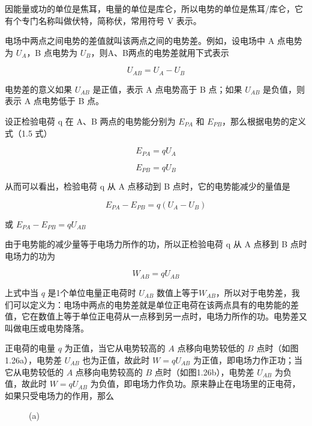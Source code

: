 因能量或功的单位是焦耳，电量的单位是库仑，所以电势的单位是焦耳/库仑，它有个专门名称叫做伏特，简称伏，常用符号
V 表示。

电场中两点之间电势的差值就叫该两点之间的电势差。例如，设电场中 A
点电势为 \(U_{A}\)，B 点电势为 \(U_{B}\)，则A、B两点的电势差就用下式表示

\[
U_{A B} = U_{A} - U_{B} \tag{1.6}
\]

电势差的意义如果 \(U_{AB}\) 是正值，表示 A 点电势高于 B 点；如果
\(U_{AB}\) 是负值，则表示 A 点电势低于 B 点。

设正检验电荷 q 在 A、B 两点的电势能分别为 \(E_{PA}\) 和
\(E_{PB}\)，那么根据电势的定义式（1.5 式）

\[
E_{P A} = q U_{A}
\]

\[
E_{P B} = q U_{B}
\]

从而可以看出，检验电荷 q 从 A 点移动到 B 点时，它的电势能减少的量值是

\[
E_{P A} - E_{P B} = q (U_{A} - U_{B})
\]

或 \(E_{PA}-E_{PB}=qU_{AB}\)

由于电势能的减少量等于电场力所作的功，所以正检验电荷 q 从 A 点移到 B
点时电场力的功为

\[
W_{A B} = q U_{A B} \tag{1.7}
\]

上式中当 \(q\) 是1个单位电量正电荷时 \(U_{AB}\)
数值上等于\(W_{AB}\)，所以对于电势差，我们可以定义为：电场中两点的电势差就是单位正电荷在该两点具有的电势能的差值，它在数值上等于单位正电荷从一点移到另一点时，电场力所作的功。电势差又叫做电压或电势降落。

正电荷的电量 \(q\) 为正值，当它从电势较高的 \(A\) 点移向电势较低的 \(B\)
点时（如图1.26a），电势差 \(U_{AB}\) 也为正值，故此时 \(W = qU_{AB}\)
为正值，即电场力作正功；当它从电势较低的 \(A\) 点移向电势较高的 \(B\)
点时（如图1.26b），电势差 \(U_{AB}\) 为负值，故此时 \(W = qU_{AB}\)
为负值，即电场力作负功。原来静止在电场里的正电荷，如果只受电场力的作用，那么

\begin{figure}
\centering
{}
\caption{(a)}
\end{figure}

